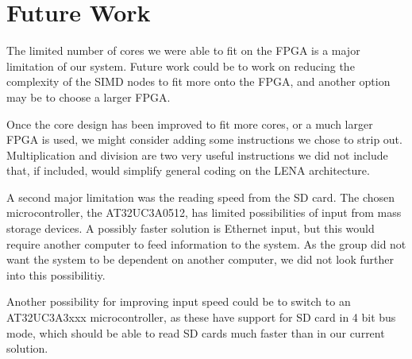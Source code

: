\section{Future Work}
The limited number of cores we were able to fit on the FPGA is a major limitation
of our system. Future work could be to work on reducing the complexity of the
SIMD nodes to fit more onto the FPGA, and another option may be to choose a larger
FPGA.

Once the core design has been improved to fit more cores, or a much larger FPGA is
used, we might consider adding some instructions we chose to strip out. Multiplication
and division are two very useful instructions we did not include that, if included, would simplify
general coding on the LENA architecture.

A second major limitation was the reading speed from the SD card.
The chosen microcontroller, the AT32UC3A0512, has limited possibilities of input
from mass storage devices. A possibly faster solution is Ethernet input, but this
would require another computer to feed information to the system. As the group did not want the system to be dependent on another computer, we did not look further into this possibilitiy.

Another possibility for improving input speed could be to switch to an AT32UC3A3xxx
microcontroller, as these have support for SD card in 4 bit bus mode, which should be
able to read SD cards much faster than in our current solution.
